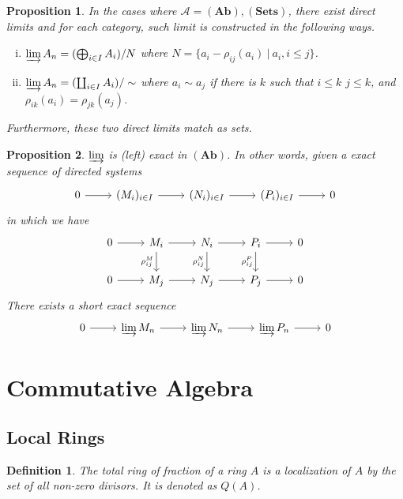 \documentclass{article}
\newtheorem{proposition}{Proposition}[section]
\newtheorem{definition}{Definition}[section]
\numberwithin{equation}{section}
\begin{document}
\begin{proposition}
In the cases where $\mathcal{A}=(\mathbf{Ab}),(\mathbf{Sets})$, there exist direct limits and for each category, such limit is constructed in the following ways.
\begin{enumerate}[i).]
\item $\varinjlim A_n = (\bigoplus_{i\in I}A_i)/N$ where $N=\{a_i-\rho_{ij}(a_i)\:|\:a_i,i\leq j\}$.
\item $\varinjlim A_n = (\coprod_{i\in I}A_i)/\sim$ where $a_i\sim a_j$ if there is $k$ such that $i\leq k$ $j\leq k$, and $\rho_{ik}(a_i)=\rho_{jk}(a_j)$.
\end{enumerate}
Furthermore, these two direct limits match as sets.
\end{proposition}

\begin{proposition}
$\varinjlim$ is (left) exact in $(\mathbf{Ab})$. In other words, 
given a exact sequence of directed systems 
\[
\begin{tikzcd}
0 \arrow[r] & (M_i)_{i\in I} \arrow[r] & (N_i)_{i\in I} \arrow[r] & (P_i)_{i\in I} \arrow[r] & 0
\end{tikzcd}
\]
in which we have
\[
\begin{tikzcd}
0 \arrow[r] & M_i \arrow[r] \arrow[d, "\rho^M_{ij}"'] & N_i \arrow[r] \arrow[d, "\rho^N_{ij}"'] & P_i \arrow[r] \arrow[d, "\rho^P_{ij}"'] & 0 \\
0 \arrow[r] & M_j \arrow[r]                           & N_j \arrow[r]                           & P_j \arrow[r]                           & 0
\end{tikzcd}
\]
There exists a short exact sequence 
\[
\begin{tikzcd}
0 \arrow[r] & \varinjlim M_n \arrow[r] & \varinjlim N_n \arrow[r] & \varinjlim P_n \arrow[r] & 0
\end{tikzcd}
\]
\end{proposition}

\section{Commutative Algebra}

\subsection{Local Rings}

\begin{definition}
The total ring of fraction of a ring $A$ is a localization of $A$ by the set of all non-zero divisors. It is denoted as $Q(A)$.
\end{definition}
\end{document}
